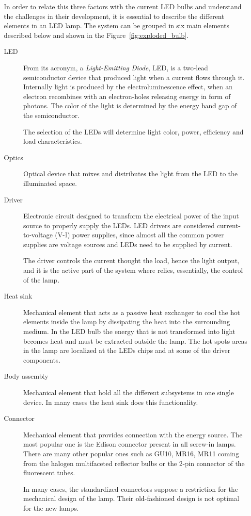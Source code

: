 In order to relate this three factors with the current LED bulbs and understand the challenges in their development, it is essential to describe the different elements in an LED lamp. The system can be grouped in six main elements described below and shown in  the Figure~\ref{fig:exploded_bulb}.

\begin{description}
  \item[LED] From its acronym, a \emph{Light-Emitting Diode}, LED, is a two-lead semiconductor device that produced light when a current flows through it. Internally light is produced by the electroluminescence effect, when an electron recombines with an electron-holes releasing energy in form of photons. The color of the light is determined by the energy band gap of the semiconductor.

      The selection of the LEDs will determine light color, power, efficiency and load characteristics.

  \item[Optics] Optical device that mixes and distributes the light from the LED to the illuminated space.

  \item[Driver] Electronic circuit designed to transform the electrical power of the input source to properly supply the LEDs. LED drivers are considered current-to-voltage (V-I) power supplies, since almost all the common power supplies are voltage sources and LEDs need to be supplied by current.

      The driver controls the current thought the load, hence the light output, and it is the active part of the system where relies, essentially, the control of the lamp.

  \item[Heat sink] Mechanical element that acts as a passive heat exchanger to cool the hot elements inside the lamp by dissipating the heat into the surrounding medium. In the LED bulb the energy that is not transformed into light becomes heat and must be extracted outside the lamp. The hot spots areas in the lamp are localized at the LEDs chips and at some of the driver components.

  \item[Body assembly] Mechanical element that hold all the different subsystems in one single device. In many cases the heat sink does this functionality.

  \item[Connector] Mechanical element that provides connection with the energy source. The most popular one is the Edison connector present in all screw-in lamps. There are many other popular ones such as GU10, MR16, MR11 coming from the halogen multifaceted reflector bulbs or the 2-pin connector of the fluorescent tubes.

      In many cases, the standardized connectors suppose a restriction for the mechanical design of the lamp. Their old-fashioned design is not optimal for the new lamps.
\end{description}

